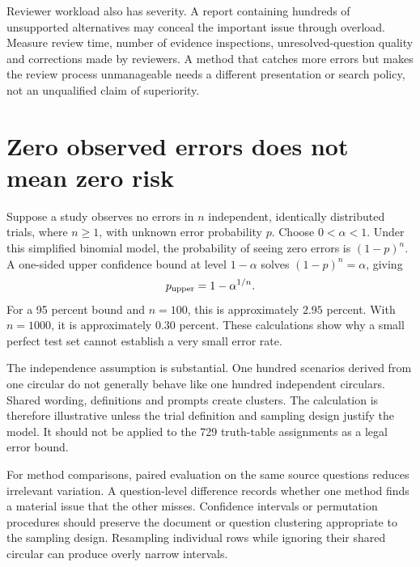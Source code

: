 Reviewer workload also has severity. A report containing hundreds of unsupported
alternatives may conceal the important issue through overload. Measure review
time, number of evidence inspections, unresolved-question quality and corrections
made by reviewers. A method that catches more errors but makes the review process
unmanageable needs a different presentation or search policy, not an unqualified
claim of superiority.

\section{Zero observed errors does not mean zero risk}
\label{merge:M09:07}


Suppose a study observes no errors in $n$ independent, identically distributed
trials, where $n\geq1$, with unknown error probability $p$. Choose
$0<\alpha<1$. Under this simplified binomial model,
the probability of seeing zero errors is $(1-p)^n$. A one-sided upper confidence
bound at level $1-\alpha$ solves $(1-p)^n=\alpha$, giving
\begin{equation}
 p_{\rm upper}=1-\alpha^{1/n}.
 \label{eq:zero-errors}
\end{equation}
For a 95 percent bound and $n=100$, this is approximately $2.95$ percent. With
$n=1000$, it is approximately $0.30$ percent. These calculations show why a small
perfect test set cannot establish a very small error rate.

The independence assumption is substantial. One hundred scenarios derived from
one circular do not generally behave like one hundred independent circulars.
Shared wording, definitions and prompts create clusters. The calculation is
therefore illustrative unless the trial definition and sampling design justify
the model. It should not be applied to the 729 truth-table assignments as a legal
error bound.


For method comparisons, paired evaluation on the same source questions reduces
irrelevant variation. A question-level difference records whether one method
finds a material issue that the other misses. Confidence intervals or permutation
procedures should preserve the document or question clustering appropriate to the
sampling design. Resampling individual rows while ignoring their shared circular
can produce overly narrow intervals.

